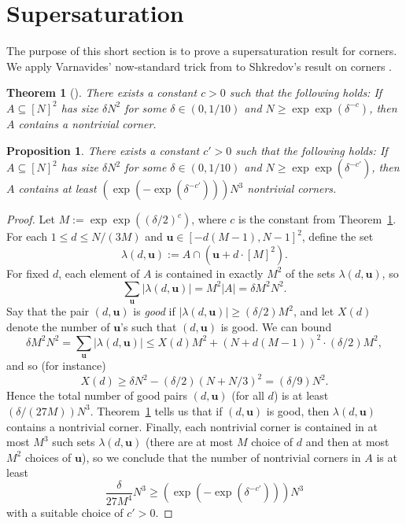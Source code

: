 \documentclass[11pt]{amsart}
\newtheorem{theorem}[lemma]{Theorem}
\newtheorem{proposition}[lemma]{Proposition}
\theoremstyle{definition}
\newcommand{\bu}{{\textbf{u}}}
\begin{document}
\section{Supersaturation}\label{A: supersaturation}
The purpose of this short section is to prove a supersaturation result for corners.  We apply Varnavides' now-standard trick from \cite{Var59} to Shkredov's result on corners \cite{Sh06b}.

\begin{theorem}[\cite{Sh06b}]\label{thm:shkredov}
There exists a constant $c>0$ such that the following holds: If $A \subseteq [N]^2$ has size $\delta N^2$ for some $\delta\in(0, 1/10)$ and $N \geq \exp \exp (\delta^{-c})$, then $A$ contains a nontrivial corner.
\end{theorem}


\begin{proposition}\label{prop:supersat}
There exists a constant $c'>0$ such that the following holds: If $A \subseteq [N]^2$ has size $\delta N^2$ for some $\delta\in(0, 1/10)$ and $N \geq \exp \exp (\delta^{-c'})$, then $A$ contains at least $(\exp(- \exp (\delta^{-c'})))N^3$ nontrivial corners.
\end{proposition}

\begin{proof}
Let $M:=\exp \exp ((\delta/2)^c)$, where $c$ is the constant from Theorem~\ref{thm:shkredov}.  For each $1 \leq d \leq N/(3M)$ and $\bu \in [-d(M-1),N-1]^2$, define the set
$$\lambda(d,\bu):= A \cap (\bu+d \cdot [M]^2).$$
For fixed $d$, each element of $A$ is contained in exactly $M^2$ of the sets $\lambda(d,\bu)$, so $$\sum_\bu |\lambda(d,\bu)|=M^2|A|=\delta M^2 N^2.$$
Say that the pair $(d,\bu)$ is \emph{good} if $|\lambda(d,\bu)| \geq (\delta/2)M^2$, and let $X(d)$ denote the number of $\bu$'s such that $(d,\bu)$ is good.  We can bound
$$\delta M^2 N^2=\sum_\bu |\lambda(d,\bu)| \leq X(d)M^2+(N+d(M-1))^2 \cdot (\delta/2)M^2,$$
and so (for instance)
$$X(d) \geq \delta N^2-(\delta/2)(N+N/3)^2=(\delta/9)N^2.$$
Hence the total number of good pairs $(d,\bu)$ (for all $d$) is at least $(\delta/(27M))N^3$.  Theorem~\ref{thm:shkredov} tells us that if $(d,\bu)$ is good, then $\lambda(d,\bu)$ contains a nontrivial corner.  Finally, each nontrivial corner is contained in at most $M^3$ such sets $\lambda(d,\bu)$ (there are at most $M$ choice of $d$ and then at most $M^2$ choices of $\bu$), so we conclude that the number of nontrivial corners in $A$ is at least
$$\frac{\delta}{27M^4} N^3 \geq (\exp(- \exp (\delta^{-c'})))N^3$$
with a suitable choice of $c'>0$.
\end{proof}




  

\end{document}
